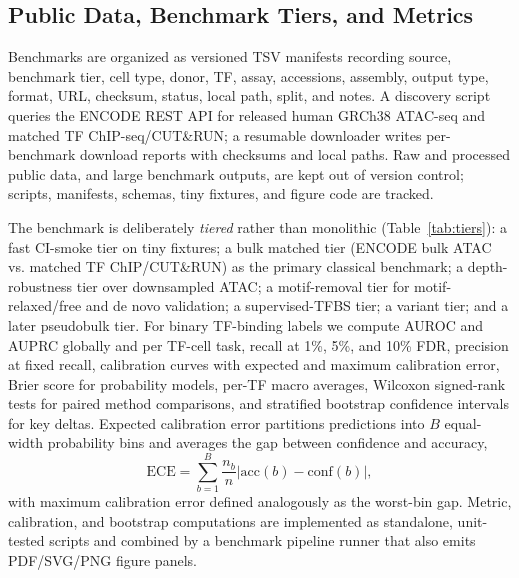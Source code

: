 \documentclass[biomedinformatics,article,submit,pdftex,moreauthors]{Definitions/mdpi}
\begin{document}
\subsection{Public Data, Benchmark Tiers, and Metrics}

Benchmarks are organized as versioned TSV manifests recording source, benchmark
tier, cell type, donor, TF, assay, accessions, assembly, output type, format,
URL, checksum, status, local path, split, and notes. A discovery script queries
the ENCODE REST API for released human GRCh38 ATAC-seq and matched TF
ChIP-seq/CUT\&RUN; a resumable downloader writes per-benchmark download reports
with checksums and local paths. Raw and processed public data, and large
benchmark outputs, are kept out of version control; scripts, manifests, schemas,
tiny fixtures, and figure code are tracked.

The benchmark is deliberately \emph{tiered} rather than monolithic
(Table~\ref{tab:tiers}): a fast CI-smoke tier on tiny fixtures; a bulk matched
tier (ENCODE bulk ATAC vs. matched TF ChIP/CUT\&RUN) as the primary classical
benchmark; a depth-robustness tier over downsampled ATAC; a motif-removal tier for
motif-relaxed/free and de novo validation; a supervised-TFBS tier; a variant tier;
and a later pseudobulk tier. For binary TF-binding labels we compute AUROC and
AUPRC globally and per TF-cell task, recall at 1\%, 5\%, and 10\% FDR, precision at
fixed recall, calibration curves with expected and maximum calibration error,
Brier score for probability models, per-TF macro averages, Wilcoxon signed-rank
tests for paired method comparisons, and stratified bootstrap confidence intervals
for key deltas. Expected calibration error partitions predictions into $B$
equal-width probability bins and averages the gap between confidence and accuracy,
\[
\mathrm{ECE}=\sum_{b=1}^{B}\frac{n_b}{n}\left|\mathrm{acc}(b)-\mathrm{conf}(b)\right|,
\]
with maximum calibration error defined analogously as the worst-bin gap. Metric, calibration, and bootstrap computations are implemented as
standalone, unit-tested scripts and combined by a benchmark pipeline runner that
also emits PDF/SVG/PNG figure panels.
\end{document}
